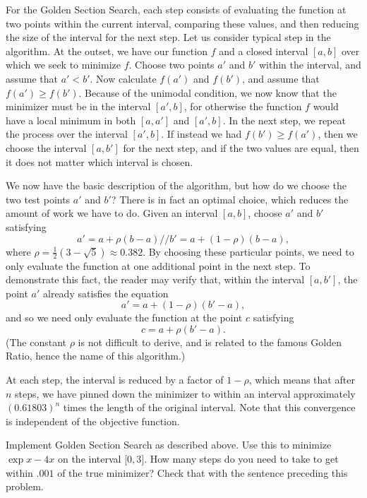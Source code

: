 For the Golden Section Search, each step consists of evaluating the function at two points within the current interval, comparing these values, and then reducing the size of the interval for the next step. Let us consider typical step in the algorithm. At the outset, we have our function $f$ and a closed interval $[a, b]$ over which we seek to minimize $f$. Choose two points $a'$ and $b'$ within the interval, and assume that $a' < b'$. Now calculate $f(a')$ and $f(b')$, and assume that $f(a') \geq f(b')$. Because of the unimodal condition, we now know that the minimizer must be in the interval $[a', b]$, for otherwise the function $f$ would have a local minimum in both $[a, a']$ and $[a', b]$. In the next step, we repeat the process over the interval $[a', b]$. If instead we had $f(b') \geq f(a')$, then we choose the interval $[a, b']$ for the next step, and if the two values are equal, then it does not matter which interval is chosen.

We now have the basic description of the algorithm, but how do we choose the two test points $a'$ and $b'$? There is in fact an optimal choice, which reduces the amount of work we have to do. Given an interval $[a, b]$, choose $a'$ and $b'$ satisfying $$
a' = a + \rho(b - a) //
b' = a + (1 - \rho)(b - a),
$$ where $\rho = \frac{1}{2}(3 - \sqrt{5}) \approx 0.382$. By choosing these particular points, we need to only evaluate the function at one additional point in the next step. To demonstrate this fact, the reader may verify that, within the interval $[a, b']$, the point $a'$ already satisfies the equation $$a' = a + (1 - \rho)(b' - a),$$ and so we need only evaluate the function at the point $c$ satisfying $$c = a + \rho(b' - a).$$ (The constant $\rho$ is not difficult to derive, and is related to the famous Golden Ratio, hence the name of this algorithm.)

At each step, the interval is reduced by a factor of $1-\rho$, which means that after $n$ steps, we have pinned down the minimizer to within an interval approximately $(0.61803)^n$ times the length of the original interval. Note that this convergence is independent of the objective function.

\begin{problem}
Implement Golden Section Search as described above. Use this to minimize $\exp{x} - 4x$ on the interval $\lbrack 0, 3 \rbrack$. How many steps do you need to take to get within $.001$ of the true minimizer? Check that with the sentence preceding this problem.
\end{problem}


